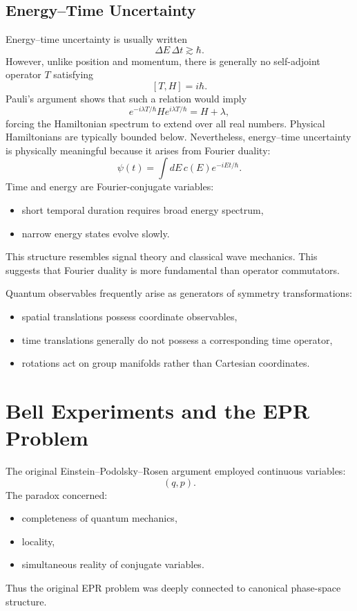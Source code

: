 \subsection{Energy--Time Uncertainty}
Energy--time uncertainty is usually written
\[\Delta E\,\Delta t\gtrsim\hbar.\]
However, unlike position and momentum, there is generally no 
self-adjoint operator $T$ satisfying
\[[T,H]=i\hbar.\]
Pauli's argument shows that such a relation would imply
\[
e^{-i\lambda T/\hbar}He^{i\lambda T/\hbar}=H+\lambda,
\]
forcing the Hamiltonian spectrum to extend over all real numbers.
Physical Hamiltonians are typically bounded below.
Nevertheless, energy--time uncertainty is physically meaningful 
because it arises from Fourier duality:
\[
\psi(t)=\int dE\,c(E)e^{-iEt/\hbar}.
\]
Time and energy are Fourier-conjugate variables:
\begin{itemize}
\item short temporal duration requires broad energy spectrum,
\item narrow energy states evolve slowly.
\end{itemize}
This structure resembles signal theory and classical wave mechanics.
This suggests that Fourier duality is more fundamental than operator 
commutators.

Quantum observables frequently arise as generators of symmetry transformations:
\begin{itemize}
\item spatial translations possess coordinate observables,
\item time translations generally do not possess a corresponding time operator,
\item rotations act on group manifolds rather than Cartesian coordinates.
\end{itemize}

\section{Bell Experiments and the EPR Problem}

The original Einstein--Podolsky--Rosen argument employed 
continuous variables:
\[
(q,p).
\]
The paradox concerned:
\begin{itemize}
\item completeness of quantum mechanics,
\item locality,
\item simultaneous reality of conjugate variables.
\end{itemize}
Thus the original EPR problem was deeply connected to canonical 
phase-space structure.

